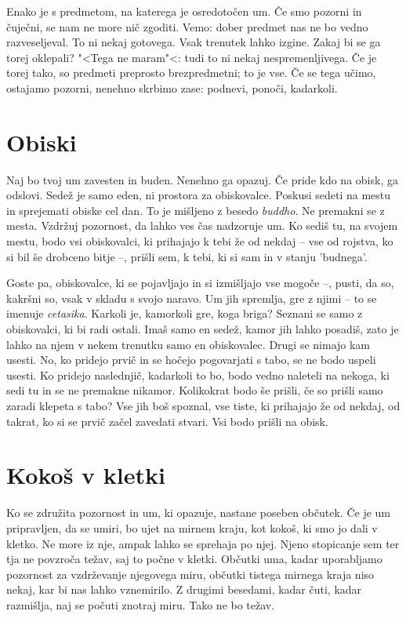 Enako je s predmetom, na katerega je osredotočen um. Če smo pozorni in čuječni, se nam ne more nič zgoditi. Vemo: dober predmet nas ne bo vedno razveseljeval. To ni nekaj gotovega. Vsak trenutek lahko izgine. Zakaj bi se ga torej oklepali? "<Tega ne maram"<: tudi to ni nekaj nespremenljivega. Če je torej tako, so predmeti preprosto brezpredmetni; to je vse. Če se tega učimo, ostajamo pozorni, nenehno skrbimo zase: podnevi, ponoči, kadarkoli.

\section{Obiski}

Naj bo tvoj um zavesten in buden. Nenehno ga opazuj. Če pride kdo na obisk, ga odslovi. Sedež je samo eden, ni prostora za obiskovalce. Poskusi sedeti na mestu in sprejemati obiske cel dan. To je mišljeno z besedo \emph{buddho}. Ne premakni se z mesta. Vzdržuj pozornost, da lahko ves čas nadzoruje um. Ko sediš tu, na svojem mestu, bodo vsi obiskovalci, ki prihajajo k tebi že od nekdaj – vse od rojstva, ko si bil še drobceno bitje –, prišli sem, k tebi, ki si sam in v stanju 'budnega'.

Goste pa, obiskovalce, ki se pojavljajo in si izmišljajo vse mogoče –, pusti, da so, kakršni so, vsak v skladu s svojo naravo. Um jih spremlja, gre z njimi – to se imenuje \emph{cetasika}. Karkoli je, kamorkoli gre, koga briga? Seznani se samo z obiskovalci, ki bi radi ostali. Imaš samo en sedež, kamor jih lahko posadiš, zato je lahko na njem v nekem trenutku samo en obiskovalec. Drugi se nimajo kam usesti. No, ko pridejo prvič in se hočejo pogovarjati s tabo, se ne bodo uspeli usesti. Ko pridejo naslednjič, kadarkoli to bo, bodo vedno naleteli na nekoga, ki sedi tu in se ne premakne nikamor. Kolikokrat bodo še prišli, če so prišli samo zaradi klepeta s tabo? Vse jih boš spoznal, vse tiste, ki prihajajo že od nekdaj, od takrat, ko si se prvič začel zavedati stvari. Vsi bodo prišli na obisk.

\section{Kokoš v kletki}

Ko se združita pozornost in um, ki opazuje, nastane poseben občutek. Če je um pripravljen, da se umiri, bo ujet na mirnem kraju, kot kokoš, ki smo jo dali v kletko. Ne more iz nje, ampak lahko se sprehaja po njej. Njeno stopicanje sem ter tja ne povzroča težav, saj to počne v kletki. Občutki uma, kadar uporabljamo pozornost za vzdrževanje njegovega miru, občutki tistega mirnega kraja niso nekaj, kar bi nas lahko vznemirilo. Z drugimi besedami, kadar čuti, kadar razmišlja, naj se počuti znotraj miru. Tako ne bo težav.

